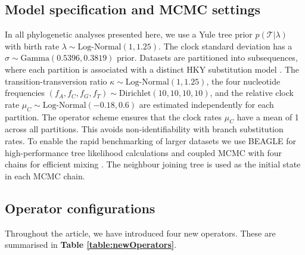\documentclass[10pt,letterpaper]{article}
\begin{document}
\clearpage
\subsection*{Model specification and MCMC settings} \label{sect:methods}

In all phylogenetic analyses presented here, we use a Yule \cite{yule1925ii} tree prior $p(\mathcal{T}|\lambda)$ with birth rate $\lambda \sim \text{Log-Normal}(1,1.25)$.
The clock standard deviation has a $\sigma \sim \text{Gamma}(0.5396,0.3819)$ prior.
Datasets are partitioned into subsequences, where each partition is associated with a distinct HKY substitution model \cite{hasegawa1985dating}.
The transition-transversion ratio $\kappa \sim \text{Log-Normal}(1, 1.25)$, the four nucleotide frequencies $(f_A, f_C, f_G, f_T) \sim \text{Dirichlet}(10,10,10,10)$, and the relative clock rate $\mu_C \sim \text{Log-Normal}(-0.18, 0.6)$ are estimated independently for each partition.
The operator scheme ensures that the clock rates $\mu_C$ have a mean of 1 across all partitions. 
This avoids non-identifiability with branch substitution rates.
To enable the rapid benchmarking of larger datasets we use BEAGLE for high-performance tree likelihood calculations \cite{ayres2012beagle} and coupled MCMC with four chains for efficient mixing \cite{muller2019coupled}.
The neighbour joining tree \cite{saitou1987neighbor} is used as the initial state in each MCMC chain.



\subsection*{Operator configurations} \label{sect:operatorSchemes}


Throughout the article, we have introduced four new operators. 
These are summarised in \textbf{Table \ref{table:newOperators}}.
\end{document}
